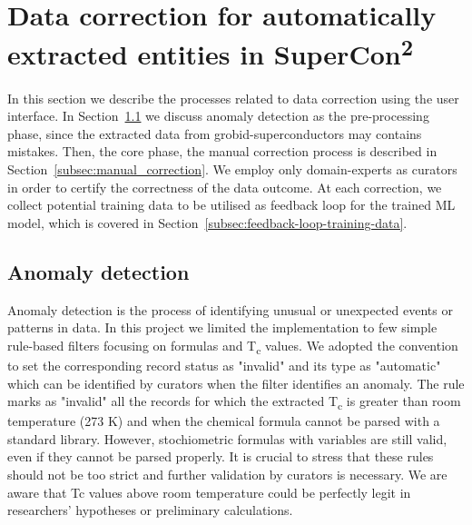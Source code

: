 \documentclass[a4paper]{article}
\begin{document}
\section{Data correction for automatically extracted entities in SuperCon\textsuperscript{2}}
In this section we describe the processes related to data correction using the user interface. 
In Section~\ref{subsec:anomaly-detection} we discuss anomaly detection as the pre-processing phase, since the extracted data from grobid-superconductors may contains mistakes.
Then, the core phase, the manual correction process is described in Section~\ref{subsec:manual_correction}. We employ only domain-experts as curators in order to certify the correctness of the data outcome. 
At each correction, we collect potential training data to be utilised as feedback loop for the trained ML model, which is covered in Section~\ref{subsec:feedback-loop-training-data}.

\subsection{Anomaly detection}
\label{subsec:anomaly-detection}
Anomaly detection is the process of identifying unusual or unexpected events or patterns in data. In this project we limited the implementation to few simple rule-based filters focusing on formulas and T\textsubscript{c} values.
We adopted the convention to set the corresponding record status as "invalid" and its type as "automatic" which can be identified by curators when the filter identifies an anomaly. 
The rule marks as "invalid" all the records for which the extracted T\textsubscript{c} is greater than room temperature (273 K) and when the chemical formula cannot be parsed with a standard library. However, stochiometric formulas with variables are still valid, even if they cannot be parsed properly.
It is crucial to stress that these rules should not be too strict  and further validation by curators is necessary. 
We are aware that Tc values above room temperature could be perfectly legit in researchers' hypotheses or preliminary calculations. 
\end{document}
